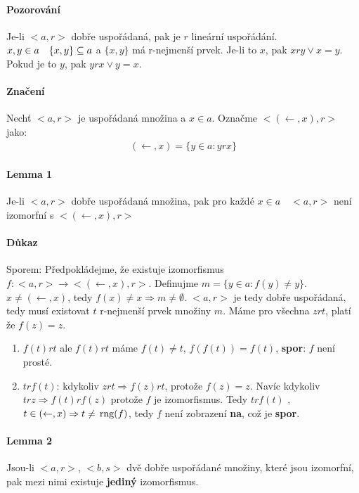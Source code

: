 \documentclass[a4paper,12pt,titlepage]{article}
\begin{document}
\paragraph{Pozorování}
Je-li $<a,r>$ dobře uspořádaná, pak je $r$ lineární uspořádání.
$x,y \in a \quad \{x,y\} \subseteq a$ a $\{x,y\}$ má r-nejmenší prvek. Je-li to
$x$,
pak $x r y \lor x = y$. Pokud je to $y$, pak $y r x \lor y = x$.
\paragraph{Značení}
Nechť $<a,r>$ je uspořádaná množina a $x \in a$. Označme $<(\leftarrow, x), r>$
jako:
\begin{align}
	(\leftarrow, x) = \{ y \in a : y r x \}
\end{align}
\paragraph{Lemma 1}
Je-li $<a,r>$ dobře uspořádaná množina, pak pro každé $x \in a \quad <a, r>$ není
izomorfní s $<(\leftarrow, x), r>$
\paragraph{Důkaz}
Sporem: Předpokládejme, že existuje izomorfismus $f: <a,r> \to <(\leftarrow, x),
r>$. Definujme $m = \{ y \in a: f(y) \neq y \}$. $x \neq (\leftarrow, x)$, tedy
$f(x) \neq x\Rightarrow m \neq \emptyset$. $<a,r>$ je tedy dobře uspořádaná,
tedy musí existovat $t$ r-nejmenší prvek množiny $m$. Máme pro všechna $z r t$,
platí že $f(z) = z$.
\begin{enumerate}
	\item $f(t) r t$ ale $f(t) r t$ máme $f(t) \neq t$, $f(f(t)) = f(t)$,
	\textbf{spor}: $f$ není prosté.
	\item $t r f(t)$: kdykoliv $z r t \Rightarrow f(z) r t$, protože $f(z) = z$.
	Navíc kdykoliv $t r z \Rightarrow f(t) r f(z)$ protože $f$ je izomorfismus.
	Tedy $t r f(t)$ , $t \in (\leftarrow, x) \Rightarrow t \neq \operatorname*{\,rng}(f)$, tedy
	$f$ není zobrazení \textbf{na}, což je \textbf{spor}.
\end{enumerate}
\paragraph{Lemma 2}
Jsou-li $<a,r>$, $<b,s>$ dvě dobře uspořádané množiny, které jsou izomorfní, pak
mezi nimi existuje \textbf{jediný} izomorfismus.
\end{document}
